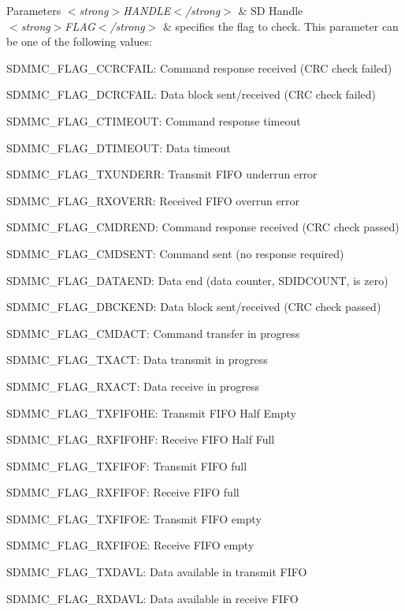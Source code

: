 \begin{DoxyParams}{Parameters}
{\em $<$strong$>$\+H\+A\+N\+D\+L\+E$<$/strong$>$} & SD Handle\\
\hline
{\em $<$strong$>$\+F\+L\+A\+G$<$/strong$>$} & specifies the flag to check. This parameter can be one of the following values\+: \begin{DoxyItemize}
\item S\+D\+M\+M\+C\+\_\+\+F\+L\+A\+G\+\_\+\+C\+C\+R\+C\+F\+A\+IL\+: Command response received (C\+RC check failed) \item S\+D\+M\+M\+C\+\_\+\+F\+L\+A\+G\+\_\+\+D\+C\+R\+C\+F\+A\+IL\+: Data block sent/received (C\+RC check failed) \item S\+D\+M\+M\+C\+\_\+\+F\+L\+A\+G\+\_\+\+C\+T\+I\+M\+E\+O\+UT\+: Command response timeout \item S\+D\+M\+M\+C\+\_\+\+F\+L\+A\+G\+\_\+\+D\+T\+I\+M\+E\+O\+UT\+: Data timeout \item S\+D\+M\+M\+C\+\_\+\+F\+L\+A\+G\+\_\+\+T\+X\+U\+N\+D\+E\+RR\+: Transmit F\+I\+FO underrun error \item S\+D\+M\+M\+C\+\_\+\+F\+L\+A\+G\+\_\+\+R\+X\+O\+V\+E\+RR\+: Received F\+I\+FO overrun error \item S\+D\+M\+M\+C\+\_\+\+F\+L\+A\+G\+\_\+\+C\+M\+D\+R\+E\+ND\+: Command response received (C\+RC check passed) \item S\+D\+M\+M\+C\+\_\+\+F\+L\+A\+G\+\_\+\+C\+M\+D\+S\+E\+NT\+: Command sent (no response required) \item S\+D\+M\+M\+C\+\_\+\+F\+L\+A\+G\+\_\+\+D\+A\+T\+A\+E\+ND\+: Data end (data counter, S\+D\+I\+D\+C\+O\+U\+NT, is zero) \item S\+D\+M\+M\+C\+\_\+\+F\+L\+A\+G\+\_\+\+D\+B\+C\+K\+E\+ND\+: Data block sent/received (C\+RC check passed) \item S\+D\+M\+M\+C\+\_\+\+F\+L\+A\+G\+\_\+\+C\+M\+D\+A\+CT\+: Command transfer in progress \item S\+D\+M\+M\+C\+\_\+\+F\+L\+A\+G\+\_\+\+T\+X\+A\+CT\+: Data transmit in progress \item S\+D\+M\+M\+C\+\_\+\+F\+L\+A\+G\+\_\+\+R\+X\+A\+CT\+: Data receive in progress \item S\+D\+M\+M\+C\+\_\+\+F\+L\+A\+G\+\_\+\+T\+X\+F\+I\+F\+O\+HE\+: Transmit F\+I\+FO Half Empty \item S\+D\+M\+M\+C\+\_\+\+F\+L\+A\+G\+\_\+\+R\+X\+F\+I\+F\+O\+HF\+: Receive F\+I\+FO Half Full \item S\+D\+M\+M\+C\+\_\+\+F\+L\+A\+G\+\_\+\+T\+X\+F\+I\+F\+OF\+: Transmit F\+I\+FO full \item S\+D\+M\+M\+C\+\_\+\+F\+L\+A\+G\+\_\+\+R\+X\+F\+I\+F\+OF\+: Receive F\+I\+FO full \item S\+D\+M\+M\+C\+\_\+\+F\+L\+A\+G\+\_\+\+T\+X\+F\+I\+F\+OE\+: Transmit F\+I\+FO empty \item S\+D\+M\+M\+C\+\_\+\+F\+L\+A\+G\+\_\+\+R\+X\+F\+I\+F\+OE\+: Receive F\+I\+FO empty \item S\+D\+M\+M\+C\+\_\+\+F\+L\+A\+G\+\_\+\+T\+X\+D\+A\+VL\+: Data available in transmit F\+I\+FO \item S\+D\+M\+M\+C\+\_\+\+F\+L\+A\+G\+\_\+\+R\+X\+D\+A\+VL\+: Data available in receive F\+I\+FO \item 
\end{DoxyItemize}
\end{DoxyParams}
